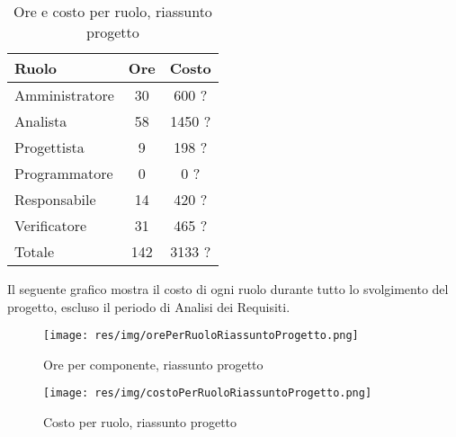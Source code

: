 \begin{table}[H]
	\centering
	\begin{tabular}{ l c c }
		\textbf{Ruolo} & \textbf{Ore} & \textbf{Costo} \\
		\hline
		Amministratore & 30 & 600 ? \\
		Analista & 58 & 1450 ? \\
		Progettista & 9 & 198 ? \\
		Programmatore & 0 & 0 ? \\
		Responsabile & 14 & 420 ? \\
		Verificatore & 31 & 465 ? \\
		\hline
		Totale & 142 & 3133 ? \\
		\hline
	\end{tabular}
	\caption{Ore e costo per ruolo, riassunto progetto}
\end{table}

Il seguente grafico mostra il costo di ogni ruolo durante tutto lo svolgimento del progetto, escluso il periodo di Analisi dei Requisiti.

\begin{figure}[H]
  \begin{center}
    \texttt{[image: res/img/orePerRuoloRiassuntoProgetto.png]}
  \caption{Ore per componente, riassunto progetto}
  \end{center} 
\end{figure}  

\begin{figure}[H]
  \begin{center}
    \texttt{[image: res/img/costoPerRuoloRiassuntoProgetto.png]}
  \caption{Costo per ruolo, riassunto progetto}
  \end{center} 
\end{figure}  


